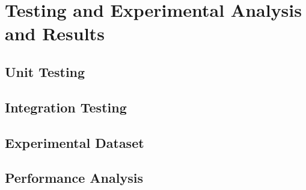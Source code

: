 \chapter{Testing and Experimental Analysis and Results}
\section{Unit Testing}
\section{Integration Testing}
\section{Experimental Dataset}
\section{Performance Analysis}